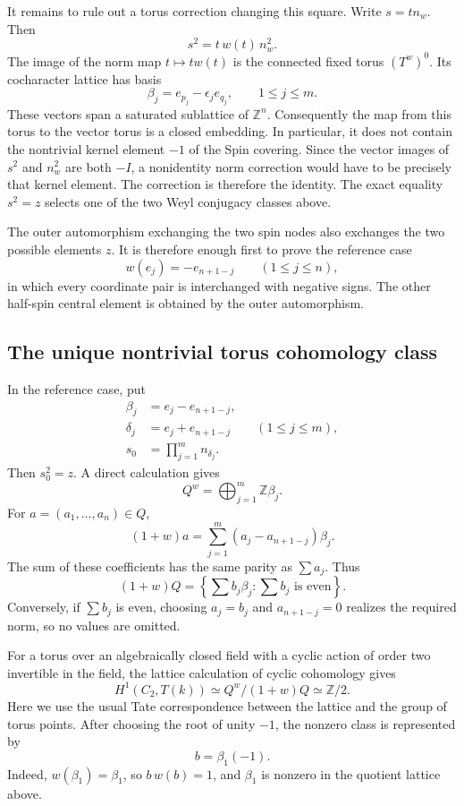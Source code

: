 \documentclass[11pt,a4paper]{article}
\theoremstyle{definition}
\theoremstyle{remark}
\begin{document}
It remains to rule out a torus correction changing this square. Write
\(s=t n_w\). Then
\[
s^2=t\,w(t)\,n_w^2.
\]
The image of the norm map \(t\mapsto t w(t)\) is the connected fixed
torus \((T^w)^0\). Its cocharacter lattice has basis
\[
\beta_j=e_{p_j}-\epsilon_j e_{q_j},
\qquad
1\leq j\leq m.
\]
These vectors span a saturated sublattice of \(\mathbb Z^n\).
Consequently the map from this torus to the vector torus is a closed
embedding. In particular, it does not contain the nontrivial kernel
element \(-1\) of the Spin covering. Since the vector images of
\(s^2\) and \(n_w^2\) are both \(-I\), a nonidentity norm correction
would have to be precisely that kernel element. The correction is
therefore the identity. The exact equality \(s^2=z\) selects one of
the two Weyl conjugacy classes above.

The outer automorphism exchanging the two spin nodes also exchanges
the two possible elements \(z\). It is therefore enough first to prove
the reference case
\[
w(e_j)=-e_{n+1-j}
\qquad
(1\leq j\leq n),
\]
in which every coordinate pair is interchanged with negative signs.
The other half-spin central element is obtained by the outer
automorphism.

\subsection{The unique nontrivial torus cohomology class}
\label{subsec:even-d-torus-cohomology}

In the reference case, put
\[
\begin{aligned}
\beta_j&=e_j-e_{n+1-j},\\
\delta_j&=e_j+e_{n+1-j}
\qquad (1\leq j\leq m),\\
s_0&=\prod_{j=1}^m n_{\delta_j}.
\end{aligned}
\]
Then \(s_0^2=z\). A direct calculation gives
\[
Q^w=\bigoplus_{j=1}^m\mathbb Z\beta_j.
\]
For \(a=(a_1,\ldots,a_n)\in Q\),
\[
(1+w)a=
\sum_{j=1}^m(a_j-a_{n+1-j})\beta_j.
\]
The sum of these coefficients has the same parity as \(\sum a_j\).
Thus
\[
(1+w)Q=
\left\{
\sum b_j\beta_j:\sum b_j\text{ is even}
\right\}.
\]
Conversely, if \(\sum b_j\) is even, choosing \(a_j=b_j\) and
\(a_{n+1-j}=0\) realizes the required norm, so no values are omitted.

For a torus over an algebraically closed field with a cyclic action of
order two invertible in the field, the lattice calculation of cyclic
cohomology gives
\[
H^1(C_2,T(k))
\simeq Q^w/(1+w)Q
\simeq\mathbb Z/2.
\]
Here we use the usual Tate correspondence between the lattice and the
group of torus points. After choosing the root of unity \(-1\), the
nonzero class is represented by
\[
b=\beta_1(-1).
\]
Indeed, \(w(\beta_1)=\beta_1\), so \(b\,w(b)=1\), and \(\beta_1\)
is nonzero in the quotient lattice above.
\end{document}
